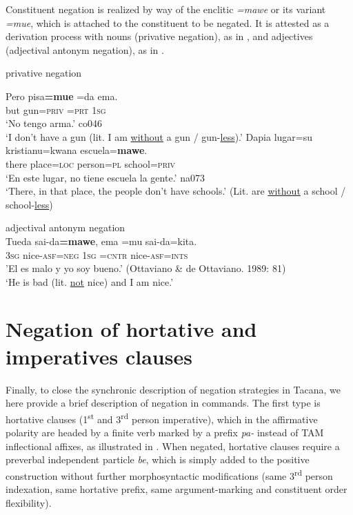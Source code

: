 \documentclass[output=paper]{langsci/langscibook}
\begin{document}
Constituent negation is realized by way of the enclitic
\textit{=mawe} or its variant \textit{=mue}, which is attached to the
constituent to be negated. It is attested as a derivation process with
nouns (privative negation), as in , and adjectives
(adjectival antonym negation), as in .

\begin{exe}\ex\label{ex:tacana-privative} privative negation
\begin{xlist}
\ex
\gll Pero pisa\textbf{=mue} =da ema.\\
    but gun=\textsc{priv} \textsc{=prt} \textsc{1sg}\\
\glt `No tengo arma.' co046\\
`I don't have a gun (lit. I am \underline{without} a gun \slash{}
gun-\underline{less}).'
\ex
\gll Dapia lugar=su kristianu=kwana escuela=\textbf{mawe}.\\
there place=\textsc{loc} person=\textsc{pl} school=\textsc{priv}\\
\glt `En este lugar, no tiene escuela la gente.' na073\\
`There, in that place, the people don't have schools.' (Lit. are
\underline{without} a school \slash{} school-\underline{less})
\end{xlist}
\ex\label{ex:tacana-antonym} adjectival antonym negation\\
\gll {}Tueda sai-da\textbf{=mawe}, ema =mu sai-da=kita.\\
3\textsc{sg} nice-\textsc{asf=neg} \textsc{1sg} \textsc{=cntr}
nice-\textsc{asf=ints}\\
\glt 'El es malo y yo soy bueno.' (Ottaviano & de Ottaviano. 1989: 81)\\
\glt `He is bad (lit. \underline{not} nice) and I am nice.'\\
\end{exe}

\section{Negation of hortative and imperatives clauses}\label{sec:tacana-8}

Finally, to close the synchronic description of negation strategies in
Tacana, we here provide a brief description of negation in commands.
The first type is hortative clauses (1\textsuperscript{st} and
3\textsuperscript{rd} person imperative), which in the affirmative polarity
are headed by a finite verb marked by a prefix \textit{pa-} instead of TAM
inflectional affixes, as illustrated in .
When negated, hortative clauses require a preverbal independent
particle \textit{be}, which is simply added to the positive construction
without further morphosyntactic modifications (same 3\textsuperscript{rd}
person indexation, same hortative prefix, same argument-marking and constituent order flexibility).
\end{document}
